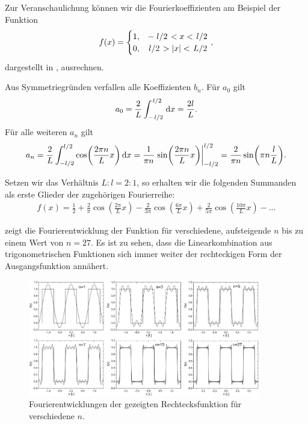 Zur Veranschaulichung können wir die Fourierkoeffizienten am Beispiel der Funktion
\begin{align}
  f(x) = \begin{cases}
    1, &-\ffrac{l}{2} < x < \ffrac{l}{2}\\
    0, &\ffrac{l}{2} > |x| < \ffrac{L}{2}
  \end{cases},
\end{align}
dargestellt in \abbref{}, ausrechnen.

Aus Symmetriegründen verfallen alle Koeffizienten $b_n$. Für $a_0$ gilt
\begin{align}
  a_0 = \frac{2}{L}\int_{-\ffrac{l}{2}}^{\ffrac{l}{2}} \dd x = \frac{2l}{L}.
\end{align}
Für alle weiteren $a_n$ gilt
\begin{align}
  a_n = \frac{2}{L} \int_{-l/2}^{l/2} \cos( \frac{2\pi n}{L} x ) \dd{x}
= \frac{1}{\pi n} \eval{ \sin( \frac{2\pi n}{L} x ) }_{-l/2}^{l/2}
= \frac{2}{\pi n} \sin( \pi n \frac{l}{L} ).
\end{align}

Setzen wir das Verhältnis $L:l = 2:1$, so erhalten wir die folgenden Summanden als erste Glieder der zugehörigen Fourierreihe:
\begin{align}
  f(x) = \frac{1}{2} 
+ \frac{2}{\pi} \cos( \frac{2\pi}{L} x ) 
- \frac{2}{3\pi} \cos( \frac{6\pi}{L} x ) 
+ \frac{2}{5\pi} \cos( \frac{10\pi}{L} x ) 
- \dots
\end{align}

 zeigt die Fourierentwicklung der Funktion für verschiedene, aufsteigende $n$ bis zu einem Wert von $n = 27$. Es ist zu sehen, dass die Linearkombination aus trigonometrischen Funktionen sich immer weiter der rechteckigen Form der Ausgangsfunktion annähert.

\begin{figure}[H]
  \centering
    \includegraphics[width=0.9\textwidth]{files/fourierentwicklung_rechteck_beispiel.png}
    \caption{Fourierentwicklungen der gezeigten Rechtecksfunktion für verschiedene $n$.}
    \label{fig:fourierentwicklung_rechteck_beispiel}
\end{figure}

